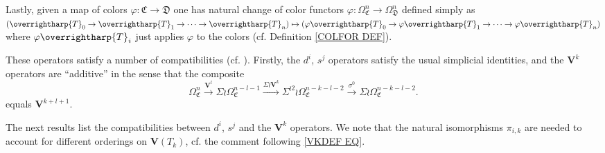 \documentclass[a4paper,10pt
,draft
]{article}%
\numberwithin{equation}{section}
\numberwithin{figure}{section}
\theoremstyle{definition} %
\newcommand{\vect}[1]{\text{\overrightharp{\ensuremath{#1}}}}
\newcommand{\1}{\ensuremath{\mathbbm 1}}%
\begin{document}
Lastly, given a map of colors 
$\varphi \colon \mathfrak{C} \to \mathfrak{D}$
one has natural change of color functors
$\varphi \colon \Omega^n_{\mathfrak{C}} \to \Omega^n_{\mathfrak{D}}$
defined simply as
$(\vect{T}_0 \to \vect{T}_1 \to \cdots \to \vect{T}_n)
\mapsto 
(\varphi\vect{T}_0 \to \varphi\vect{T}_1 \to \cdots \to \varphi\vect{T}_n)$
where $\varphi \vect{T}_i$
just applies $\varphi$ to the colors 
(cf. Definition \ref{COLFOR DEF}).


These operators satisfy a number of compatibilities (cf. \cite[Prop. 3.90]{BP_geo}). Firstly, the $d^i$, $s^j$ operators satisfy the usual simplicial identities, 
and the $\boldsymbol{V}^k$ operators are ``additive'' in the sense that
the composite
\begin{equation}\label{VKADD EQ}
	\Omega^{n}_{\mathfrak{C}} \xrightarrow{\boldsymbol{V}^l} 
	\Sigma \wr \Omega^{n-l-1}_{\mathfrak{C}} \xrightarrow{\Sigma \wr \boldsymbol{V}^k}
	\Sigma^{\wr 2} \wr \Omega^{n-k-l-2}_{\mathfrak{C}} \xrightarrow{\sigma^0}
	\Sigma \wr \Omega^{n-k-l-2}_{\mathfrak{C}}.
\end{equation}
equals $\boldsymbol{V}^{k+l+1}$.

The next results list the compatibilities between $d^i$, $s^j$ and the $\boldsymbol{V}^k$ operators.
We note that the natural isomorphisms $\pi_{i,k}$
are needed to account for different orderings on 
$\boldsymbol{V}(T_k)$,
cf. the comment following \eqref{VKDEF EQ}.
\end{document}
